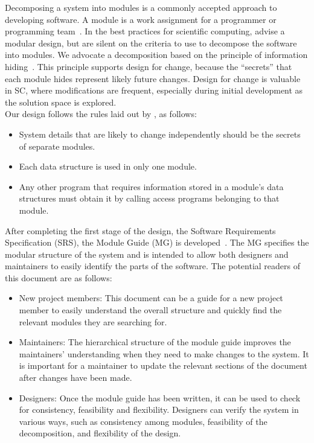 \documentclass[12pt]{article}
\begin{document}
Decomposing a system into modules is a commonly accepted approach to developing software.  A module is a work assignment for a programmer or programming team~\citep{ParnasEtAl1984}.  In the best practices for scientific computing, \citet{WilsonEtAl2013} advise a modular design, but are silent on the criteria to use to decompose the software into modules.  We advocate a decomposition based on the principle of information hiding~\citep{Parnas1972a}. This principle supports design for change, because the ``secrets'' that each module hides represent likely future changes.  Design for change is valuable in SC, where modifications are frequent, especially during initial development as the solution space is explored.  \\
\newline
Our design follows the rules laid out by \citet{ParnasEtAl1984}, as follows:
\begin{itemize}
\item System details that are likely to change independently should be the
  secrets of separate modules.
\item Each data structure is used in only one module.
\item Any other program that requires information stored in a module's data
  structures must obtain it by calling access programs belonging to that module.
\end{itemize}

\noindent After completing the first stage of the design, the Software Requirements
Specification (SRS), the Module Guide (MG) is developed~\citep{ParnasEtAl1984}. The MG
specifies the modular structure of the system and is intended to allow both
designers and maintainers to easily identify the parts of the software.  The
potential readers of this document are as follows:

\begin{itemize}
\item New project members: This document can be a guide for a new project member
  to easily understand the overall structure and quickly find the
  relevant modules they are searching for.
\item Maintainers: The hierarchical structure of the module guide improves the
  maintainers' understanding when they need to make changes to the system. It is
  important for a maintainer to update the relevant sections of the document
  after changes have been made.
\item Designers: Once the module guide has been written, it can be used to
  check for consistency, feasibility and flexibility. Designers can verify the
  system in various ways, such as consistency among modules, feasibility of the
  decomposition, and flexibility of the design.
\end{itemize}
\end{document}
